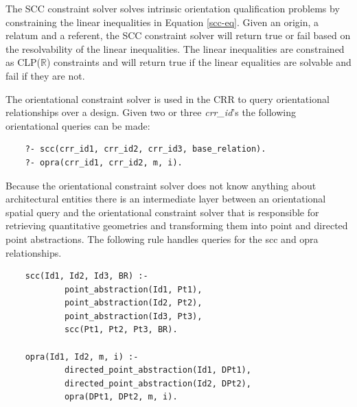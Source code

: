 \documentclass[12pt]{ucthesis}
\begin{document}
The SCC constraint solver solves intrinsic orientation qualification problems by constraining the linear inequalities in Equation \ref{scc-eq}. Given an origin, a relatum and a referent, the SCC constraint solver will return true or fail based on the resolvability of the linear inequalities. The linear inequalities are constrained as CLP($\mathbb{R}$) constraints and will return true if the linear equalities are solvable and fail if they are not.

The orientational constraint solver is used in the CRR to query orientational relationships over a design. Given two or three \emph{crr\_id}'s the following orientational queries can be made: 
\begin{verbatim}
    ?- scc(crr_id1, crr_id2, crr_id3, base_relation).
    ?- opra(crr_id1, crr_id2, m, i).
\end{verbatim} Because the orientational constraint solver does not know anything about architectural entities there is an intermediate layer between an orientational spatial query and the orientational constraint solver that is responsible for retrieving quantitative geometries and transforming them into point and directed point abstractions. The following rule handles queries for the scc and opra relationships.
\begin{verbatim}
    scc(Id1, Id2, Id3, BR) :-
            point_abstraction(Id1, Pt1),
            point_abstraction(Id2, Pt2),
            point_abstraction(Id3, Pt3),
            scc(Pt1, Pt2, Pt3, BR).

    opra(Id1, Id2, m, i) :-
            directed_point_abstraction(Id1, DPt1),
            directed_point_abstraction(Id2, DPt2),
            opra(DPt1, DPt2, m, i).
\end{verbatim}



\end{document}
